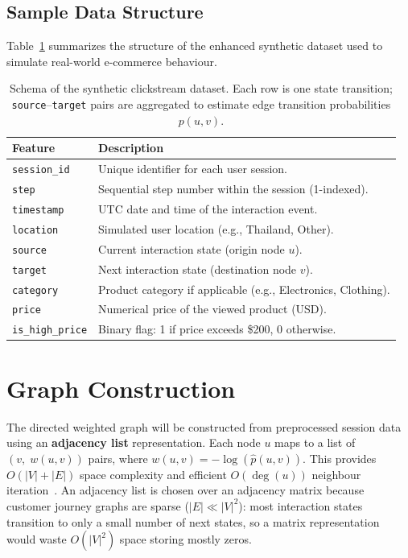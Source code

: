 \subsection{Sample Data Structure}

Table~\ref{table:data_structure} summarizes the structure of the enhanced synthetic dataset used to simulate real-world e-commerce behaviour.

\begin{table}[h!]
\centering
\begin{tabular}{@{}ll@{}}
\toprule
\textbf{Feature} & \textbf{Description} \\
\midrule
\texttt{session\_id} & Unique identifier for each user session. \\
\texttt{step} & Sequential step number within the session (1-indexed). \\
\texttt{timestamp} & UTC date and time of the interaction event. \\
\texttt{location} & Simulated user location (e.g., Thailand, Other). \\
\texttt{source} & Current interaction state (origin node $u$). \\
\texttt{target} & Next interaction state (destination node $v$). \\
\texttt{category} & Product category if applicable (e.g., Electronics, Clothing). \\
\texttt{price} & Numerical price of the viewed product (USD). \\
\texttt{is\_high\_price} & Binary flag: 1 if price exceeds \$200, 0 otherwise. \\
\bottomrule
\end{tabular}
\caption[Clickstream dataset schema]{Schema of the synthetic clickstream dataset. Each row is one state transition; \texttt{source}--\texttt{target} pairs are aggregated to estimate edge transition probabilities $p(u,v)$.}
\label{table:data_structure}
\end{table}

\section{Graph Construction}

The directed weighted graph will be constructed from preprocessed session data using an \textbf{adjacency list} representation. Each node $u$ maps to a list of $(v,\; w(u,v))$ pairs, where $w(u,v) = -\log(\hat{p}(u,v))$. This provides $O(|V|+|E|)$ space complexity and efficient $O(\deg(u))$ neighbour iteration~\citep{cormen2009}. An adjacency list is chosen over an adjacency matrix because customer journey graphs are sparse ($|E| \ll |V|^2$): most interaction states transition to only a small number of next states, so a matrix representation would waste $O(|V|^2)$ space storing mostly zeros.

